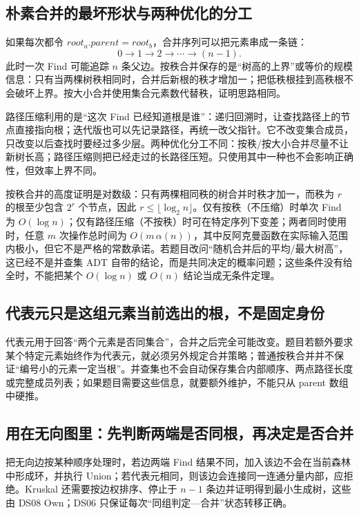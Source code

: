 \documentclass[UTF8,fontset=none,11pt,a4paper]{ctexart}
\begin{document}
\subsection{朴素合并的最坏形状与两种优化的分工}
如果每次都令 $root_a.parent=root_b$，合并序列可以把元素串成一条链：
\[
0\to1\to2\to\cdots\to(n-1).
\]
此时一次 Find 可能追踪 $n$ 条父边。按秩合并保存的是“树高的上界”或等价的规模信息：只有当两棵树秩相同时，合并后新根的秩才增加一；把低秩根挂到高秩根不会破坏上界。按大小合并使用集合元素数代替秩，证明思路相同。

路径压缩利用的是“这次 Find 已经知道根是谁”：递归回溯时，让查找路径上的节点直接指向根；迭代版也可以先记录路径，再统一改父指针。它不改变集合成员，只改变以后查找时要经过多少层。两种优化分工不同：按秩/按大小合并尽量不让新树长高；路径压缩则把已经走过的长路径压短。只使用其中一种也不会影响正确性，但效率上界不同。

按秩合并的高度证明是对数级：只有两棵相同秩的树合并时秩才加一，而秩为 $r$ 的根至少包含 $2^r$ 个节点，因此 $r\le\lfloor\log_2 n\rfloor$。仅有按秩（不压缩）时单次 Find 为 $O(\log n)$；仅有路径压缩（不按秩）时可在特定序列下变差；两者同时使用时，任意 $m$ 次操作总时间为 $O(m\,\alpha(n))$，其中反阿克曼函数在实际输入范围内极小，但它不是严格的常数承诺。若题目改问“随机合并后的平均/最大树高”，这已经不是并查集 ADT 自带的结论，而是共同决定的概率问题；这些条件没有给全时，不能把某个 $O(\log n)$ 或 $O(n)$ 结论当成无条件定理。

\subsection{代表元只是这组元素当前选出的根，不是固定身份}
代表元用于回答“两个元素是否同集合”，合并之后完全可能改变。题目若额外要求某个特定元素始终作为代表元，就必须另外规定合并策略；普通按秩合并并不保证“编号小的元素一定当根”。并查集也不会自动保存集合内部顺序、两点路径长度或完整成员列表；如果题目需要这些信息，就要额外维护，不能只从 parent 数组中硬推。

\subsection{用在无向图里：先判断两端是否同根，再决定是否合并}
把无向边按某种顺序处理时，若边两端 Find 结果不同，加入该边不会在当前森林中形成环，并执行 Union；若代表元相同，则该边会连接同一连通分量内部，应拒绝。Kruskal 还需要按边权排序、停止于 $n-1$ 条边并证明得到最小生成树，这些由 DS08 Own；DS06 只保证每次“同组判定—合并”状态转移正确。
\end{document}

